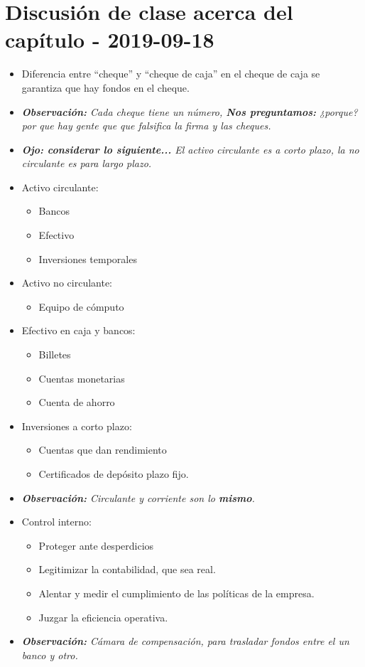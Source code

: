 \documentclass{article}
\begin{document}
\section{Discusión de clase acerca del capítulo - 2019-09-18}
\begin{itemize}
    \item Diferencia entre ``cheque'' y ``cheque de caja'' en el cheque de caja se garantiza que hay fondos en el cheque.
    \item \emph{\textbf{Observación: }Cada cheque tiene un número, \textbf{Nos preguntamos:} ¿porque?por que hay gente que que falsifica la firma y las cheques.}
    \item \emph{\textbf{Ojo: considerar lo siguiente...} El activo circulante es a corto plazo, la no circulante es para largo plazo.}
    \item Activo circulante:
    \begin{itemize}
        \item Bancos
        \item Efectivo 
        \item Inversiones temporales
    \end{itemize}
    
    \item Activo no circulante:
    \begin{itemize}
        \item Equipo de cómputo 
    \end{itemize}

    \item Efectivo en caja y bancos:
    \begin{itemize}
        \item Billetes
        \item Cuentas monetarias 
        \item Cuenta de ahorro
    \end{itemize}
    
    \item Inversiones a corto plazo:
    \begin{itemize}
        \item Cuentas que dan rendimiento 
        \item Certificados de depósito plazo fijo.
    \end{itemize}
    
    \item \emph{\textbf{Observación: }Circulante y corriente son lo \textbf{mismo}.}
    \item Control interno:
    \begin{itemize}
        \item Proteger ante desperdicios
        \item Legitimizar la contabilidad, que sea real.
        \item Alentar y medir el cumplimiento de las políticas de la empresa.
        \item Juzgar la eficiencia operativa.
    \end{itemize} 
    
    \item \emph{\textbf{Observación: }Cámara de compensación, para trasladar fondos entre el un banco y otro.}
\end{itemize}
\end{document}
